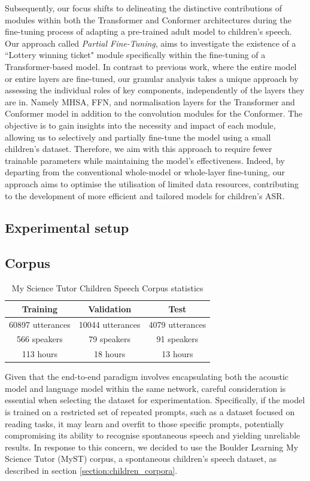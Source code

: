 Subsequently, our focus shifts to delineating the distinctive contributions of modules within both the Transformer and Conformer architectures during the fine-tuning process of adapting a pre-trained adult model to children's speech. Our approach called \textit{Partial Fine-Tuning}, aims to investigate the existence of a ``Lottery winning ticket" module specifically within the fine-tuning of a Transformer-based model.
In contrast to previous work, where the entire model or entire layers are fine-tuned, our granular analysis takes a unique approach by assessing the individual roles of key components, independently of the layers they are in. Namely \ac{MHSA}, \ac{FFN}, and normalisation layers for the Transformer and Conformer model in addition to the convolution modules for the Conformer. The objective is to gain insights into the necessity and impact of each module, allowing us to selectively and partially fine-tune the model using a small children's dataset. Therefore, we aim with this approach to require fewer trainable parameters while maintaining the model's effectiveness. Indeed, by departing from the conventional whole-model or whole-layer fine-tuning, our approach aims to optimise the utilisation of limited data resources, contributing to the development of more efficient and tailored models for children's \ac{ASR}.


\subsection{Experimental setup}
\label{section:methods_chapter4}

\subsection{Corpus}
\begin{table}[ht]
\centering
\begin{tabular}{c|c|c}
\hline
 Training & Validation     & Test   \\ \hline
60897 utterances  & 10044 utterances   & 4079 utterances \\ 
 566 speakers  & 79 speakers   & 91 speakers \\ 
 113 hours  & 18 hours   & 13 hours \\ \hline

\end{tabular}
\caption{My Science Tutor Children Speech Corpus statistics}
\label{tab:statistics_myst}
\end{table}
Given that the end-to-end paradigm involves encapsulating both the acoustic model and language model within the same network, careful consideration is essential when selecting the dataset for experimentation. Specifically, if the model is trained on a restricted set of repeated prompts, such as a dataset focused on reading tasks, it may learn and overfit to those specific prompts, potentially compromising its ability to recognise spontaneous speech and yielding unreliable results. In response to this concern, we decided to use the Boulder Learning My Science Tutor (MyST) corpus, a spontaneous children's speech dataset, as described in section \ref{section:children_corpora}. 

